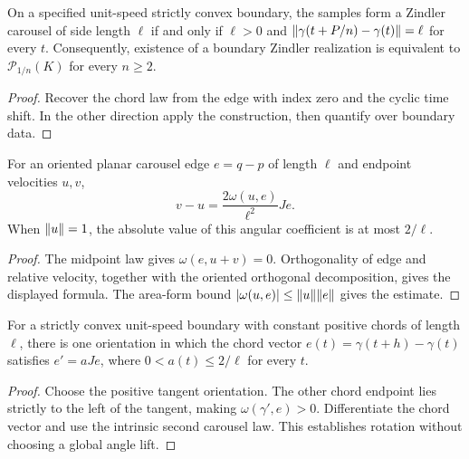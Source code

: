 \begin{proposition}
\label{prop:zindler-geometric}
\leanok
{}
On a specified unit-speed strictly convex boundary, the samples form a
Zindler carousel of side length $\ell$ if and only if $\ell>0$ and
$\lVert \gamma(t+P/n)-\gamma(t)\rVert=\ell$ for every $t$.
Consequently, existence of a boundary Zindler realization is equivalent
to $\mathcal P_{1/n}(K)$ for every $n\geq2$.
\end{proposition}
\begin{proof}
\leanok
Recover the chord law from the edge with index zero and the cyclic time shift.
In the other direction apply the construction, then quantify over boundary data.
\end{proof}

\begin{lemma}
\label{lem:second-carousel}
\leanok
{}
For an oriented planar carousel edge $e=q-p$ of length $\ell$ and endpoint
velocities $u,v$,
\[
 v-u=\frac{2\omega(u,e)}{\ell^2}Je.
\]
When $\lVert u\rVert=1$, the absolute value of this angular coefficient is at
most $2/\ell$.
\end{lemma}
\begin{proof}
\leanok
The midpoint law gives $\omega(e,u+v)=0$. Orthogonality of edge and
relative velocity, together with the oriented orthogonal decomposition,
gives the displayed formula. The area-form bound
$|\omega(u,e)|\leq\lVert u\rVert\lVert e\rVert$ gives the estimate.
\end{proof}

\begin{proposition}
\label{prop:boundary-chord-rotation}
\leanok
{}
For a strictly convex unit-speed boundary with constant positive chords
of length $\ell$, there is one orientation in which the chord vector
$e(t)=\gamma(t+h)-\gamma(t)$ satisfies $e'=aJe$, where
$0<a(t)\leq2/\ell$ for every $t$.
\end{proposition}
\begin{proof}
\leanok
Choose the positive tangent orientation. The other chord endpoint lies
strictly to the left of the tangent, making $\omega(\gamma',e)>0$.
Differentiate the chord vector and use the intrinsic second carousel law.
This establishes rotation without choosing a global angle lift.
\end{proof}

